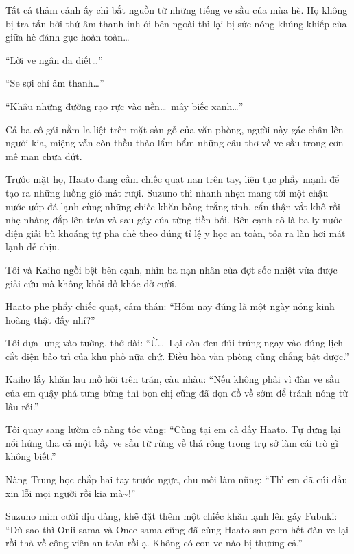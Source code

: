 \documentclass[../main.tex]{subfiles}
\begin{document}
Tất cả thảm cảnh ấy chỉ bắt nguồn từ những tiếng ve sầu của mùa hè. Họ không bị tra tấn bởi thứ âm thanh inh ỏi bên ngoài thì lại bị sức nóng khủng khiếp của giữa hè đánh gục hoàn toàn\dots

\omk


``Lời ve ngân da diết\dots''

``Se sợi chỉ âm thanh\dots''

``Khâu những đường rạo rực vào nền\dots\ mây biếc xanh\dots''

Cả ba cô gái nằm la liệt trên mặt sàn gỗ của văn phòng, người này gác chân lên người kia, miệng vẫn còn thều thào lẩm bẩm những câu thơ về ve sầu trong cơn mê man chưa dứt.

Trước mặt họ, Haato đang cầm chiếc quạt nan trên tay, liên tục phẩy mạnh để tạo ra những luồng gió mát rượi. Suzuno thì nhanh nhẹn mang tới một chậu nước ướp đá lạnh cùng những chiếc khăn bông trắng tinh, cẩn thận vắt khô rồi nhẹ nhàng đắp lên trán và sau gáy của từng tiền bối. Bên cạnh cô là ba ly nước điện giải bù khoáng tự pha chế theo đúng tỉ lệ y học an toàn, tỏa ra làn hơi mát lạnh dễ chịu.


Tôi và Kaiho ngồi bệt bên cạnh, nhìn ba nạn nhân của đợt sốc nhiệt vừa được giải cứu mà không khỏi dở khóc dở cười.

Haato phe phẩy chiếc quạt, cảm thán: ``Hôm nay đúng là một ngày nóng kinh hoàng thật đấy nhỉ?''

Tôi dựa lưng vào tường, thở dài: ``Ừ\dots\ Lại còn đen đủi trúng ngay vào đúng lịch cắt điện bảo trì của khu phố nữa chứ. Điều hòa văn phòng cũng chẳng bật được.''

Kaiho lấy khăn lau mồ hôi trên trán, càu nhàu: ``Nếu không phải vì đàn ve sầu của em quậy phá tưng bừng thì bọn chị cũng đã dọn đồ về sớm để tránh nóng từ lâu rồi.''

Tôi quay sang lườm cô nàng tóc vàng: ``Cũng tại em cả đấy Haato. Tự dưng lại nổi hứng tha cả một bầy ve sầu từ rừng về thả rông trong trụ sở làm cái trò gì không biết.''

Nàng Trung học chắp hai tay trước ngực, chu môi làm nũng: ``Thì em đã cúi đầu xin lỗi mọi người rồi kia mà\~{}!''

Suzuno mỉm cười dịu dàng, khẽ đặt thêm một chiếc khăn lạnh lên gáy Fubuki: ``Dù sao thì Onii-sama và Onee-sama cũng đã cùng Haato-san gom hết đàn ve lại rồi thả về công viên an toàn rồi ạ. Không có con ve nào bị thương cả.''
\end{document}
